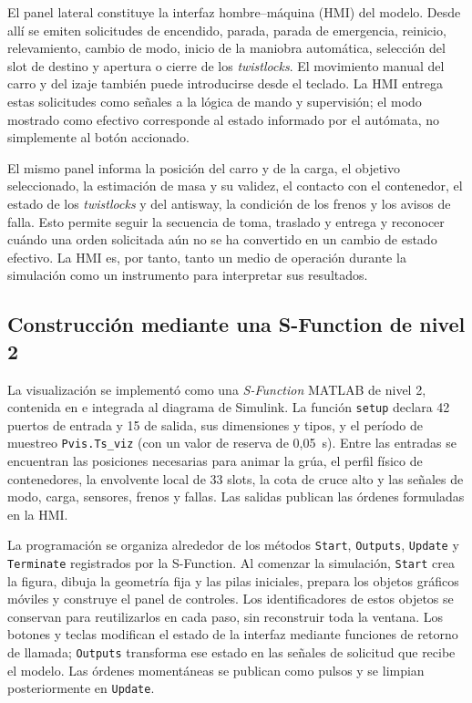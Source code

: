 \documentclass[a4paper,10pt,onecolumn,journal]{ieeeconf}
\numberwithin{equation}{section}
\begin{document}
El panel lateral constituye la interfaz hombre--máquina (HMI) del modelo. Desde allí se emiten solicitudes de encendido, parada, parada de emergencia, reinicio, relevamiento, cambio de modo, inicio de la maniobra automática, selección del slot de destino y apertura o cierre de los \textit{twistlocks}. El movimiento manual del carro y del izaje también puede introducirse desde el teclado. La HMI entrega estas solicitudes como señales a la lógica de mando y supervisión; el modo mostrado como efectivo corresponde al estado informado por el autómata, no simplemente al botón accionado.

El mismo panel informa la posición del carro y de la carga, el objetivo seleccionado, la estimación de masa y su validez, el contacto con el contenedor, el estado de los \textit{twistlocks} y del antisway, la condición de los frenos y los avisos de falla. Esto permite seguir la secuencia de toma, traslado y entrega y reconocer cuándo una orden solicitada aún no se ha convertido en un cambio de estado efectivo. La HMI es, por tanto, tanto un medio de operación durante la simulación como un instrumento para interpretar sus resultados.


\subsection{Construcción mediante una S-Function de nivel 2}

La visualización se implementó como una \textit{S-Function} MATLAB de nivel 2, contenida en  e integrada al diagrama de Simulink. La función \texttt{setup} declara 42 puertos de entrada y 15 de salida, sus dimensiones y tipos, y el período de muestreo \texttt{Pvis.Ts\_viz} (con un valor de reserva de 0,05~s). Entre las entradas se encuentran las posiciones necesarias para animar la grúa, el perfil físico de contenedores, la envolvente local de 33 slots, la cota de cruce alto y las señales de modo, carga, sensores, frenos y fallas. Las salidas publican las órdenes formuladas en la HMI.

La programación se organiza alrededor de los métodos \texttt{Start}, \texttt{Outputs}, \texttt{Update} y \texttt{Terminate} registrados por la S-Function. Al comenzar la simulación, \texttt{Start} crea la figura, dibuja la geometría fija y las pilas iniciales, prepara los objetos gráficos móviles y construye el panel de controles. Los identificadores de estos objetos se conservan para reutilizarlos en cada paso, sin reconstruir toda la ventana. Los botones y teclas modifican el estado de la interfaz mediante funciones de retorno de llamada; \texttt{Outputs} transforma ese estado en las señales de solicitud que recibe el modelo. Las órdenes momentáneas se publican como pulsos y se limpian posteriormente en \texttt{Update}.
\end{document}
